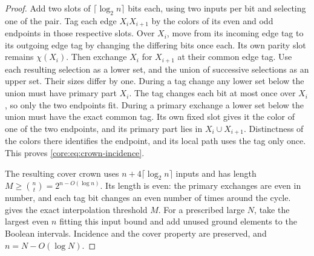 \begin{proof}
Add two slots of $\lceil\log_2 n\rceil$ bits each, using two inputs
per bit and selecting one of the pair. Tag each edge $X_iX_{i+1}$
by the colors of its even and odd endpoints in those respective
slots. Over $X_i$, move from its incoming edge tag to its outgoing
edge tag by changing the differing bits once each. Its own parity
slot remains $\chi(X_i)$. Then exchange $X_i$ for $X_{i+1}$ at
their common edge tag. Use each resulting selection as a lower set,
and the union of successive selections as an upper set. Their
sizes differ by one. During a tag change any lower set below the
union must have primary part $X_i$. The tag changes each bit at
most once over $X_i$, so only the two endpoints fit. During a primary
exchange a lower set below the union must have the exact common tag.
Its own fixed slot gives it the color of one of the two endpoints,
and its primary part lies in $X_i\cup X_{i+1}$. Distinctness of the
colors there identifies the endpoint, and its local path uses the
tag only once. This proves \eqref{core:eq:crown-incidence}.

The resulting cover crown uses $n+4\lceil\log_2 n\rceil$ inputs
and has length $M\ge\binom nt=2^{n-O(\log n)}$. Its length is even:
the primary exchanges are even in number, and each tag bit changes
an even number of times around the cycle. 
gives the exact interpolation threshold $M$. For a prescribed
large $N$, take the largest even $n$ fitting this input bound and
add unused ground elements to the Boolean intervals. Incidence and
the cover property are preserved, and $n=N-O(\log N)$.
\end{proof}

